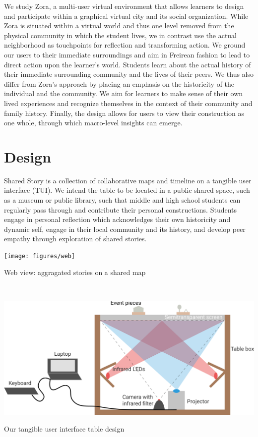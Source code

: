 \documentclass{sigchi-ext}
\begin{document}
We study Zora, a multi-user virtual environment that allows learners to design and participate within a graphical virtual city and its social organization. While Zora is situated within a virtual world and thus one level removed from the physical community in which the student lives, we in contrast use the actual neighborhood as touchpoints for reflection and transforming action. We ground our users to their immediate surroundings and aim in Freirean fashion to lead to direct action upon the learner's world. Students learn about the actual history of their immediate surrounding community and the lives of their peers. We thus also differ from Zora's approach by placing an emphasis on the historicity of the individual and the community. We aim for learners to make sense of their own lived experiences and recognize themselves in the context of their community and family history. Finally, the design allows for users to view their construction as one whole, through which macro-level insights can emerge.

\section{Design}
Shared Story is a collection of collaborative maps and timeline on a tangible user interface (TUI). We intend the table to be located in a public shared space, such as a museum or public library, such that middle and high school students can regularly pass through and contribute their personal constructions. Students engage in personal reflection which acknowledges their own historicity and dynamic self, engage in their local community and its history, and develop peer empathy through exploration of shared stories.


\begin{marginfigure}[-57pc]
  \begin{minipage}{\marginparwidth}
    \centering
    \texttt{[image: figures/web]}
    \caption{Web view: aggragated stories on a shared map}~\label{fig:web}
  \end{minipage}
\end{marginfigure}

\begin{marginfigure}[-36pc]
  \begin{minipage}{\marginparwidth}
    \centering
    \includegraphics[width=0.9\marginparwidth]{figures/tui}
    \caption{Our tangible user interface table design}~\label{fig:tui}
  \end{minipage}
\end{marginfigure}
\end{document}
